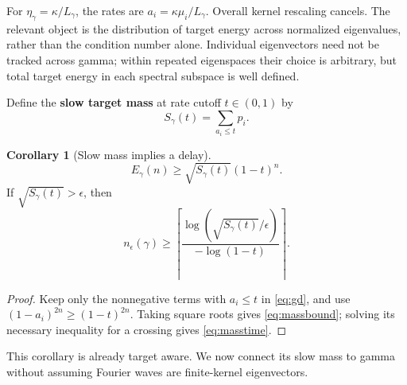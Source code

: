 \documentclass[11pt]{article}
\theoremstyle{definition}
\newtheorem{corollary}{Corollary}
\begin{document}
For $\eta_\gamma=\kappa/L_\gamma$, the rates are
$a_i=\kappa\mu_i/L_\gamma$. Overall kernel rescaling cancels. The relevant
object is the distribution of target energy across normalized eigenvalues,
rather than the condition number alone. Individual eigenvectors need not be
tracked across gamma; within repeated eigenspaces their choice is arbitrary,
but total target energy in each spectral subspace is well defined.

Define the \textbf{slow target mass} at rate cutoff $t\in(0,1)$ by
\begin{equation*}S_\gamma(t)=\sum_{a_i\le t}p_i.\end{equation*}
\begin{corollary}[Slow mass implies a delay]
\begin{equation}\label{eq:massbound}
 E_\gamma(n)\ge\sqrt{S_\gamma(t)}(1-t)^n.
\end{equation}
If $\sqrt{S_\gamma(t)}>\epsilon$, then
\begin{equation}\label{eq:masstime}
 n_\epsilon(\gamma)\ge\left\lceil
 \frac{\log(\sqrt{S_\gamma(t)}/\epsilon)}{-\log(1-t)}\right\rceil.
\end{equation}
\end{corollary}
\begin{proof}
Keep only the nonnegative terms with $a_i\le t$ in \eqref{eq:gd}, and use
$(1-a_i)^{2n}\ge(1-t)^{2n}$. Taking square roots gives
\eqref{eq:massbound}; solving its necessary inequality for a crossing gives
\eqref{eq:masstime}.
\end{proof}
This corollary is already target aware. We now connect its slow mass to gamma
without assuming Fourier waves are finite-kernel eigenvectors.
\end{document}
